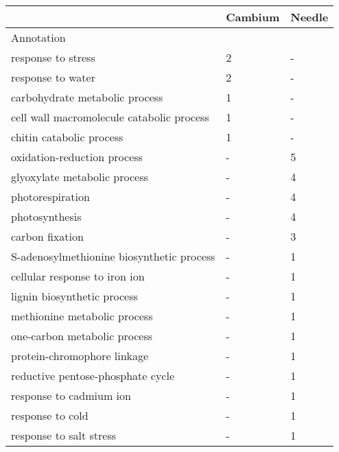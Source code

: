\begin{tabular}{lll}
\toprule
{} & Cambium & Needle \\
\midrule
Annotation                                &         &        \\
response to stress                        &  2 &  - \\
response to water                         &  2 &  - \\
carbohydrate metabolic process            &  1 &  - \\
cell wall macromolecule catabolic process &  1 &  - \\
chitin catabolic process                  &  1 &  - \\
oxidation-reduction process               &  - &  5 \\
glyoxylate metabolic process              &  - &  4 \\
photorespiration                          &  - &  4 \\
photosynthesis                            &  - &  4 \\
carbon fixation                           &  - &  3 \\
S-adenosylmethionine biosynthetic process &  - &  1 \\
cellular response to iron ion             &  - &  1 \\
lignin biosynthetic process               &  - &  1 \\
methionine metabolic process              &  - &  1 \\
one-carbon metabolic process              &  - &  1 \\
protein-chromophore linkage               &  - &  1 \\
reductive pentose-phosphate cycle         &  - &  1 \\
response to cadmium ion                   &  - &  1 \\
response to cold                          &  - &  1 \\
response to salt stress                   &  - &  1 \\
\bottomrule
\end{tabular}
